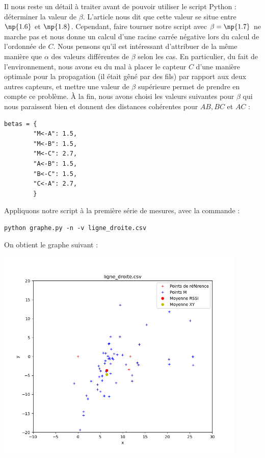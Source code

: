 \documentclass[french, a4paper, 12pt, parskip]{scrartcl}
\begin{document}
Il nous reste un détail à traiter avant de pouvoir utiliser le script Python :
déterminer la valeur de $\beta$. L'article \cite{RSSI} nous dit que cette valeur
se situe entre $\np{1.6}$ et $\np{1.8}$. Cependant, faire tourner notre script
avec $\beta=\np{1.7}$ ne marche pas et nous donne un calcul d'une racine carrée
négative lors du calcul de l'ordonnée de $C$. Nous pensons qu'il est intéressant
d'attribuer de la même manière que $\alpha$ des valeurs différentes de $\beta$
selon les cas. En particulier, du fait de l'environnement, nous avons eu du mal
à placer le capteur $C$ d'une manière optimale pour la propagation (il était
gêné par des fils) par rapport aux deux autres capteurs, et mettre une valeur de
$\beta$ supérieure permet de prendre en compte ce problème. À la fin, nous avons
choisi les valeurs suivantes pour $\beta$ qui nous paraissent bien et donnent
des distances cohérentes pour $AB, BC$ et $AC$ :
\begin{verbatim}
betas = {
        "M<-A": 1.5,
        "M<-B": 1.5,
        "M<-C": 2.7,
        "A<-B": 1.5,
        "B<-C": 1.5,
        "C<-A": 2.7,
        }
\end{verbatim}

Appliquons notre script à la première série de mesures, avec la commande :
\begin{verbatim}
python graphe.py -n -v ligne_droite.csv
\end{verbatim}

On obtient le graphe suivant :
\begin{center}
  \includegraphics[width=0.9\textwidth]{trilat1.png}
\end{center}
\end{document}
